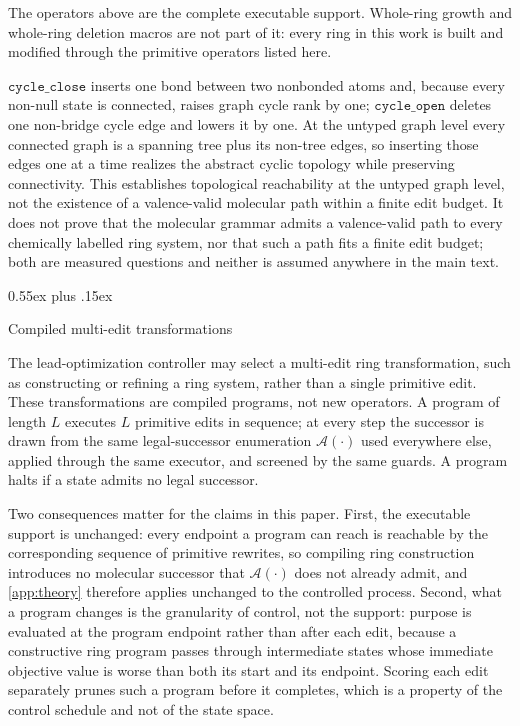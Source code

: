\documentclass{article}
\makeatletter
\theoremstyle{definition}
\theoremstyle{remark}
\def\subsection{\@startsection{subsection}{2}{\z@}{-1.2ex plus -0.4ex minus -.2ex}%
  {0.55ex plus .15ex}{\normalsize\sc\raggedright}}
\newcommand{\A}{\mathcal{A}}
\newcommand{\op}[1]{\texttt{#1}}
\makeatother
\begin{document}
The operators above are the complete executable support. Whole-ring growth and whole-ring deletion macros are not part of it: every ring in this work is built and modified through the primitive operators listed here.

$\op{cycle\_close}$ inserts one bond between two nonbonded atoms and, because every non-null state is connected, raises graph cycle rank by one; $\op{cycle\_open}$ deletes one non-bridge cycle edge and lowers it by one.
At the untyped graph level every connected graph is a spanning tree plus its non-tree edges, so inserting those edges one at a time realizes the abstract cyclic topology while preserving connectivity.
This establishes topological reachability at the untyped graph level, not the existence of a valence-valid molecular path within a finite edit budget.
It does not prove that the molecular grammar admits a valence-valid path to every chemically labelled ring system, nor that such a path fits a finite edit budget; both are measured questions and neither is assumed anywhere in the main text.

\subsection{Compiled multi-edit transformations}
\label{app:macros}

The lead-optimization controller may select a multi-edit ring transformation, such
as constructing or refining a ring system, rather than a single primitive edit.
These transformations are compiled programs, not new operators. A program of
length $L$ executes $L$ primitive edits in sequence; at every step the successor
is drawn from the same legal-successor enumeration $\A(\cdot)$ used everywhere
else, applied through the same executor, and screened by the same guards. A
program halts if a state admits no legal successor.

Two consequences matter for the claims in this paper. First, the executable
support is unchanged: every endpoint a program can reach is reachable by the
corresponding sequence of primitive rewrites, so compiling ring construction
introduces no molecular successor that $\A(\cdot)$ does not already admit, and
\cref{app:theory} therefore applies unchanged to the controlled process. Second,
what a program changes is the granularity of control, not the support: purpose is
evaluated at the program endpoint rather than after each edit, because a
constructive ring program passes through intermediate states whose immediate
objective value is worse than both its start and its endpoint. Scoring each edit
separately prunes such a program before it completes, which is a property of the
control schedule and not of the state space.
\end{document}
